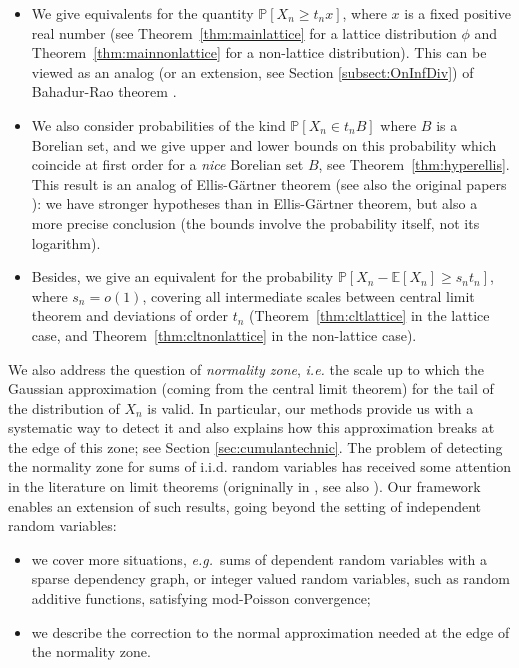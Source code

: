 \documentclass[12pt,a4paper,reqno]{amsart}
\theoremstyle{remark}
\newcommand{\esper}{\mathbb{E}}
\newcommand{\proba}{\mathbb{P}}
\begin{document}
\begin{itemize}
\item We give equivalents for the quantity $\proba[X_n \ge t_n x]$, where $x$ is a fixed positive real number (see  Theorem~\ref{thm:mainlattice} for a lattice distribution $\phi$ and Theorem~\ref{thm:mainnonlattice} for a non-lattice distribution). This can be viewed as an analog (or an extension, see Section \ref{subsect:OnInfDiv}) of Bahadur-Rao theorem \cite{BR60}.\vspace{2mm}

\item We also consider probabilities of the kind $\proba[X_n \in t_n B]$ where $B$ is a Borelian set, and we give upper and lower bounds on this probability which coincide at first order for a {\em nice} Borelian set $B$, see Theorem~\ref{thm:hyperellis}. This result is an analog of Ellis-G\"artner theorem \cite[Theorem 2.3.6]{DZ98} (see also the original papers \cite{Gar77,Ellis84}): we have stronger hypotheses than in Ellis-Gärtner theorem, but also a more precise conclusion (the bounds involve the probability itself, not its logarithm).\vspace{2mm}

\item Besides, we give an equivalent for the probability $\proba[X_n -\esper[X_n] \ge s_n t_n]$, where $s_n=o(1)$, covering all intermediate scales between central limit theorem and deviations of order $t_n$ (Theorem~\ref{thm:cltlattice} in the lattice case, and Theorem~\ref{thm:cltnonlattice} in the non-lattice case).
\end{itemize}    
We also address the question of {\em normality zone}, {\it i.e.} the scale up to which the Gaussian approximation 
(coming from the central limit theorem) for the tail of the distribution of $X_n$ is valid.
In particular, our methods provide us with a systematic way to detect it and also explains how this approximation breaks at the edge of this zone; see Section \ref{sec:cumulantechnic}. 
The problem of detecting the normality zone for sums of i.i.d. random variables has received some attention in the literature on limit theorems (origninally in \cite{Cramer38}, see also \cite{IL71}).
Our framework enables an extension of such results, going beyond the setting of independent random variables:\vspace{1mm}
\begin{itemize}
\item we cover more situations, {\em e.g.}~sums of dependent random variables with a sparse dependency graph, or integer valued random variables, such as random additive functions, satisfying mod-Poisson convergence;\vspace{1mm}
\item we describe the correction to the normal approximation needed at the edge of the normality zone.
\end{itemize}
\end{document}
